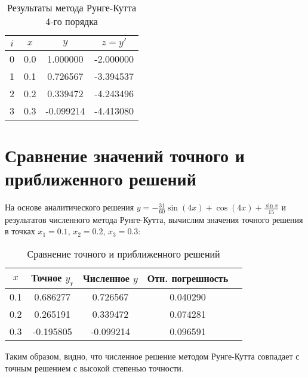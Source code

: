 \documentclass[a4paper,12pt]{article}
\begin{document}
\begin{table}[h!]
\centering
\caption{Результаты метода Рунге-Кутта 4-го порядка}
\label{tab:runge_kutta}
\begin{tabular}{|c|c|c|c|}
\hline
\textbf{\(i\)} & \textbf{\(x\)} & \textbf{\(y\)} & \textbf{\(z = y'\)} \\
\hline
0 & 0.0 & 1.000000 & -2.000000 \\
1 & 0.1 & 0.726567 & -3.394537 \\
2 & 0.2 & 0.339472 & -4.243496 \\
3 & 0.3 & -0.099214 & -4.413080 \\
\hline
\end{tabular}
\end{table}
\section{Сравнение значений точного и приближенного решений}

На основе аналитического решения \(y = -\frac{31}{60} \sin(4x) + \cos(4x) + \frac{\sin x}{15}\) и результатов численного метода Рунге-Кутта, вычислим значения точного решения в точках \(x_1 = 0.1\), \(x_2 = 0.2\), \(x_3 = 0.3\):

\begin{table}[h!]
\centering
\caption{Сравнение точного и приближенного решений}
\label{tab:comparison}
\begin{tabular}{|c|c|c|c|c|}
\hline
\textbf{\(x\)} & \textbf{Точное \(y_{т}\)} & \textbf{Численное  \(y\)} & \textbf{Отн. погрешность} \\
\hline
0.1 & 0.686277 & 0.726567 & 0.040290 \\
0.2 & 0.265191 & 0.339472 & 0.074281 \\
0.3 & -0.195805 & -0.099214 & 0.096591 \\
\hline
\end{tabular}
\end{table}

Таким образом, видно, что численное решение методом Рунге-Кутта совпадает с точным решением с высокой степенью точности.
\end{document}
